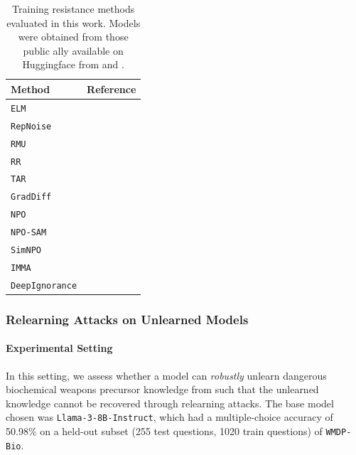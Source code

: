 \documentclass{article}
\theoremstyle{plain}
\theoremstyle{definition}
\theoremstyle{remark}
\begin{document}
\begin{table}[t]
\centering
\caption{Training resistance methods evaluated in this work. Models were obtained from those public ally available on Huggingface from \citet{che2025model} and \citet{fan2025llmunlearningresilientrelearning}.}
\label{tab:training-resistance-methods}
\begin{sc}
\begin{tabular}{ll}
\toprule
Method & Reference \\
\midrule
\texttt{ELM} & \citet{gandikota2024erasing} \\
\texttt{RepNoise} &   
\citet{rosati2024representation} \\
\texttt{RMU} & \citet{li2024wmdp} \\
\texttt{RR} & \citet{zouimproving} \\
\texttt{TAR} & \citet{tamirisa2025tamperresistantsafeguardsopenweightllms} \\
\texttt{GradDiff} & \citet{liu2022continual} \\
\texttt{NPO} & \citet{zhang2024negative} \\
\texttt{NPO-SAM} & \citet{fan2025llmunlearningresilientrelearning} \\
\texttt{SimNPO} & \citet{fan2024simplicity} \\
\texttt{IMMA} & \citet{zheng2024imma} \\
\texttt{DeepIgnorance} & \citet{o2025deep} \\
\bottomrule
\end{tabular}
\end{sc}
\end{table}

\subsubsection{Relearning Attacks on Unlearned Models}
\label{app:relearning-attacks}
\paragraph{Experimental Setting}
In this setting, we assess whether a model can \textit{robustly} \citep{deeb2024unlearning,tamirisa2025tamperresistantsafeguardsopenweightllms} unlearn dangerous biochemical weapons precursor knowledge from \citet{li2024wmdp} such that the unlearned knowledge cannot be recovered through relearning attacks. The base model chosen was \texttt{Llama-3-8B-Instruct}, which had a multiple-choice accuracy of 50.98\% on a held-out subset (255 test questions, 1020 train questions) of \texttt{WMDP-Bio}.
\end{document}
